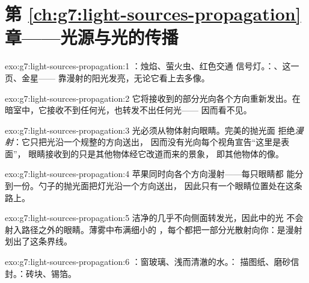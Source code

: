 \section*{第 \ref{ch:g7:light-sources-propagation} 章——光源与光的传播}

\begin{solution}{exo:g7:light-sources-propagation:1}
：烛焰、萤火虫、红色交通
信号灯。：、这一页、金星——
靠漫射的阳光发亮，无论它看上去多像。
\end{solution}

\begin{solution}{exo:g7:light-sources-propagation:2}
它将接收到的部分光向各个方向重新发出。在
暗室中，它接收不到任何光，也转发不出任何光——
因而看不见。
\end{solution}

\begin{solution}{exo:g7:light-sources-propagation:3}
光必须从物体射向眼睛。完美的抛光面
拒绝\emph{漫射}：它只把光沿一个规整的方向送出，
因而没有光向每个视角宣告“这里是表面”，
眼睛接收到的只是其他物体经它改道而来的景象，
即其他物体的像。
\end{solution}

\begin{solution}{exo:g7:light-sources-propagation:4}
苹果同时向各个方向漫射——每只眼睛都
能分到一份。勺子的抛光面把灯光沿一个方向送出，
因此只有一个眼睛位置处在这条路上。
\end{solution}

\begin{solution}{exo:g7:light-sources-propagation:5}
洁净的几乎不向侧面转发光，因此中的光
不会射入路径之外的眼睛。薄雾中布满细小的
，每个都把一部分光散射向你：是漫射
划出了这条界线。
\end{solution}

\begin{solution}{exo:g7:light-sources-propagation:6}
：窗玻璃、浅而清澈的水。：
描图纸、磨砂信封。：砖块、锡箔。
\end{solution}

